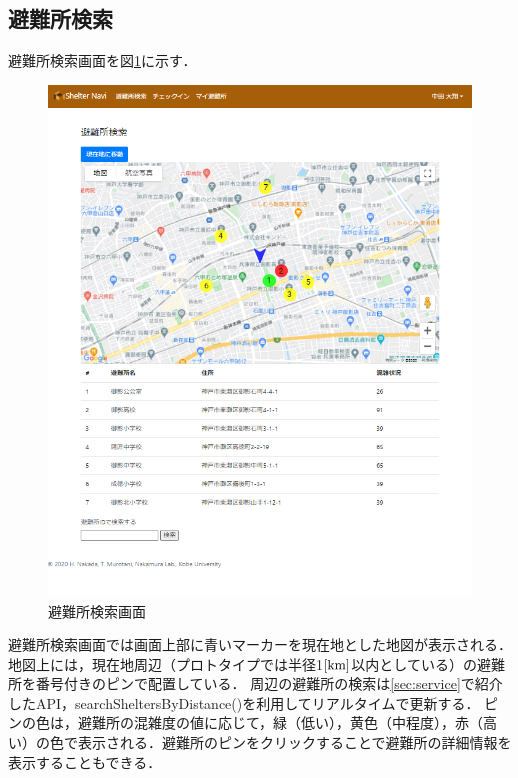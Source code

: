 \documentclass[technicalreport,dvipdfmx]{ieicej}
\begin{document}
\subsection{避難所検索}
避難所検索画面を図\ref{fig:search_shelter}に示す．

\begin{figure}[t]
     \begin{center}
          \includegraphics[scale=0.6,pagebox=cropbox,clip]{img/search_shelter.png}
          \caption{避難所検索画面}
          \label{fig:search_shelter}
     \end{center}
\end{figure}

避難所検索画面では画面上部に青いマーカーを現在地とした地図が表示される．地図上には，現在地周辺（プロトタイプでは半径1$\rm[km]$以内としている）の避難所を番号付きのピンで配置している．
周辺の避難所の検索は\ref{sec:service}で紹介したAPI，searchSheltersByDistance()を利用してリアルタイムで更新する．
ピンの色は，避難所の混雑度の値に応じて，緑（低い），黄色（中程度），赤（高い）の色で表示される．避難所のピンをクリックすることで避難所の詳細情報を表示することもできる．
\end{document}
